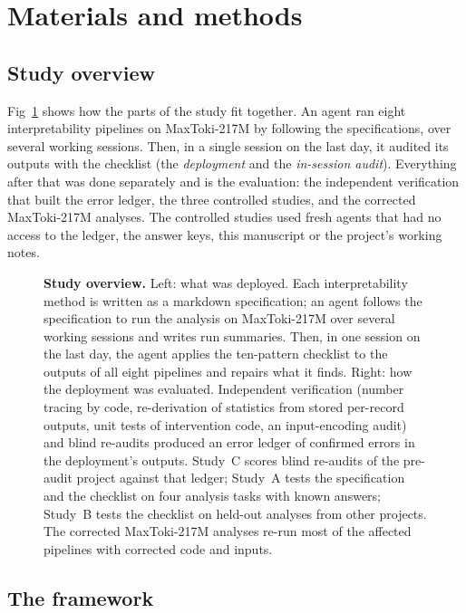 \section*{Materials and methods}

\subsection*{Study overview}
Fig~\ref{fig:overview} shows how the parts of the study fit together. An
agent ran eight interpretability pipelines on MaxToki-217M by following
the specifications, over several working sessions. Then, in a single
session on the last day, it audited its outputs with the checklist (the
\emph{deployment} and the \emph{in-session audit}). Everything after that was done separately and is the evaluation:
the independent verification that built the error ledger, the three
controlled studies, and the corrected MaxToki-217M analyses. The
controlled studies used fresh agents that had no access to the ledger,
the answer keys, this manuscript or the project's working notes.

\begin{figure}[H]
\caption{\textbf{Study overview.} Left: what was deployed. Each
interpretability method is written as a markdown specification; an agent
follows the specification to run the analysis on MaxToki-217M over
several working sessions and writes run summaries. Then, in one session
on the last day, the agent applies the ten-pattern checklist to the
outputs of all eight pipelines and repairs what it finds. Right: how the deployment was
evaluated. Independent verification (number tracing by code,
re-derivation of statistics from stored per-record outputs, unit tests of
intervention code, an input-encoding audit) and blind re-audits produced
an error ledger of confirmed errors in the deployment's outputs.
Study~C scores blind re-audits of the pre-audit project against that
ledger; Study~A tests the specification and the checklist on four
analysis tasks with known answers; Study~B tests the checklist on held-out
analyses from other projects. The corrected MaxToki-217M analyses re-run
most of the affected pipelines with corrected code and inputs.}
\label{fig:overview}
\end{figure}

\subsection*{The framework}

